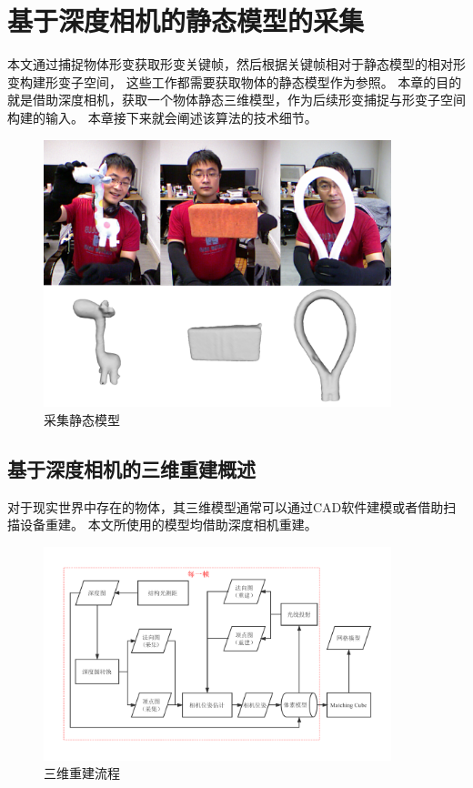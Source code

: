 \chapter{基于深度相机的静态模型的采集}

 本文通过捕捉物体形变获取形变关键帧，然后根据关键帧相对于静态模型的相对形变构建形变子空间，
 这些工作都需要获取物体的静态模型作为参照。
 本章的目的就是借助深度相机，获取一个物体静态三维模型，作为后续形变捕捉与形变子空间构建的输入。
 本章接下来就会阐述该算法的技术细节。
\begin{figure}
    \centering
    \includegraphics[width=0.9\textwidth]{./Pictures/static_mesh.eps}
    \caption{采集静态模型}
    \label{static_model}
\end{figure}

\section{基于深度相机的三维重建概述}
对于现实世界中存在的物体，其三维模型通常可以通过CAD软件建模或者借助扫描设备重建。
本文所使用的模型均借助深度相机重建。
\begin{figure}
    \centering
    \includegraphics[width = 0.9\textwidth]{./Pictures/kf_pipeline_cropped.pdf}
    \caption{三维重建流程}
    \label{kfpipeline}
\end{figure}

